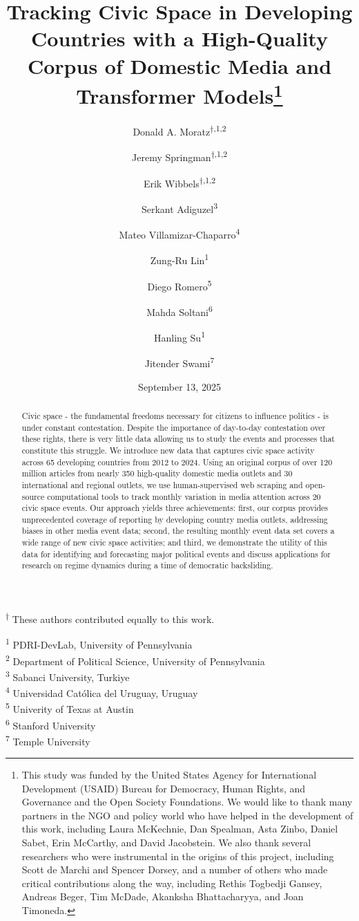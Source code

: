 \documentclass[
  letterpaper,
  DIV=11,
  numbers=noendperiod]{scrartcl}
\title{Tracking Civic Space in Developing Countries with a High-Quality
Corpus of Domestic Media and Transformer Models\thanks{This study was
funded by the United States Agency for International Development (USAID)
Bureau for Democracy, Human Rights, and Governance and the Open Society
Foundations. We would like to thank many partners in the NGO and policy
world who have helped in the development of this work, including Laura
McKechnie, Dan Spealman, Asta Zinbo, Daniel Sabet, Erin McCarthy, and
David Jacobstein. We also thank several researchers who were
instrumental in the origins of this project, including Scott de Marchi
and Spencer Dorsey, and a number of others who made critical
contributions along the way, including Rethis Togbedji Gansey, Andreas
Beger, Tim McDade, Akanksha Bhattacharyya, and Joan Timoneda.}}
\author{Donald A. Moratz\textsuperscript{$\dagger{}$,1,2} \and Jeremy
Springman\textsuperscript{$\dagger{}$,1,2} \and Erik
Wibbels\textsuperscript{$\dagger{}$,1,2} \and Serkant
Adiguzel\textsuperscript{3} \and Mateo
Villamizar-Chaparro\textsuperscript{4} \and Zung-Ru
Lin\textsuperscript{1} \and Diego Romero\textsuperscript{5} \and Mahda
Soltani\textsuperscript{6} \and Hanling
Su\textsuperscript{1} \and Jitender Swami\textsuperscript{7}}
\date{September 13, 2025}
\begin{document}
\maketitle
\begin{abstract}
Civic space - the fundamental freedoms necessary for citizens to
influence politics - is under constant contestation. Despite the
importance of day-to-day contestation over these rights, there is very
little data allowing us to study the events and processes that
constitute this struggle. We introduce new data that captures civic
space activity across 65 developing countries from 2012 to 2024. Using
an original corpus of over 120 million articles from nearly 350
high-quality domestic media outlets and 30 international and regional
outlets, we use human-supervised web scraping and open-source
computational tools to track monthly variation in media attention across
20 civic space events. Our approach yields three achievements: first,
our corpus provides unprecedented coverage of reporting by developing
country media outlets, addressing biases in other media event data;
second, the resulting monthly event data set covers a wide range of new
civic space activities; and third, we demonstrate the utility of this
data for identifying and forecasting major political events and discuss
applications for research on regime dynamics during a time of democratic
backsliding.
\end{abstract}
\ifdefined\Shaded\renewenvironment{Shaded}{\begin{tcolorbox}[borderline west={3pt}{0pt}{shadecolor}, breakable, frame hidden, enhanced, boxrule=0pt, interior hidden, sharp corners]}{\end{tcolorbox}}\fi

\textsuperscript{$\dagger{}$}
These authors contributed equally to this work.

\textsuperscript{1} PDRI-DevLab, University of Pennsylvania\\
\textsuperscript{2} Department of Political Science, University of
Pennsylvania\\
\textsuperscript{3} Sabanci University, Turkiye\\
\textsuperscript{4} Universidad Católica del Uruguay, Uruguay\\
\textsuperscript{5} Univerity of Texas at Austin\\
\textsuperscript{6} Stanford University\\
\textsuperscript{7} Temple University

\newpage{}
\end{document}
